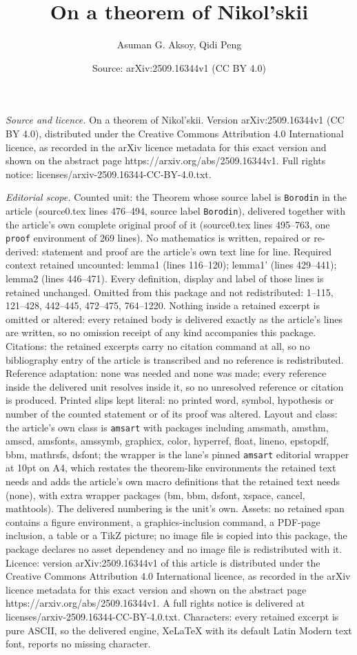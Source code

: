 \documentclass[10pt,a4paper]{amsart}
\title[On a theorem of Nikol'skii]{On a theorem of Nikol'skii}
\author{Asuman G. Aksoy, Qidi Peng}
\date{Source: arXiv:2509.16344v1 (CC BY 4.0)}
\begin{document}
\maketitle

\noindent\emph{Source and licence.} On a theorem of Nikol'skii. Version arXiv:2509.16344v1 (CC BY 4.0), distributed under the Creative Commons Attribution 4.0 International licence, as recorded in the arXiv licence metadata for this exact version and shown on the abstract page https://arxiv.org/abs/2509.16344v1. Full rights notice: licenses/arxiv-2509.16344-CC-BY-4.0.txt.\par\smallskip

\noindent\textit{Editorial scope.} Counted unit: the Theorem whose source label is \texttt{Borodin} in the article (source0.tex lines 476--494, source label \texttt{Borodin}), delivered together with the article's own complete original proof of it (source0.tex lines 495--763, one \texttt{proof} environment of 269 lines). No mathematics is written, repaired or re-derived: statement and proof are the article's own text line for line. Required context retained uncounted: lemma1 (lines 116--120); lemma1' (lines 429--441); lemma2 (lines 446--471). Every definition, display and label of those lines is retained unchanged. Omitted from this package and not redistributed: 1--115, 121--428, 442--445, 472--475, 764--1220. Nothing inside a retained excerpt is omitted or altered: every retained body is delivered exactly as the article's lines are written, so no omission receipt of any kind accompanies this package. Citations: the retained excerpts carry no citation command at all, so no bibliography entry of the article is transcribed and no reference is redistributed. Reference adaptation: none was needed and none was made; every reference inside the delivered unit resolves inside it, so no unresolved reference or citation is produced. Printed slips kept literal: no printed word, symbol, hypothesis or number of the counted statement or of its proof was altered. Layout and class: the article's own class is \texttt{amsart} with packages including amsmath, amsthm, amscd, amsfonts, amssymb, graphicx, color, hyperref, float, lineno, epstopdf, bbm, mathrsfs, dsfont; the wrapper is the lane's pinned \texttt{amsart} editorial wrapper at 10pt on A4, which restates the theorem-like environments the retained text needs and adds the article's own macro definitions that the retained text needs (none), with extra wrapper packages (bm, bbm, dsfont, xspace, cancel, mathtools). The delivered numbering is the unit's own. Assets: no retained span contains a figure environment, a graphics-inclusion command, a PDF-page inclusion, a table or a TikZ picture; no image file is copied into this package, the package declares no asset dependency and no image file is redistributed with it. Licence: version arXiv:2509.16344v1 of this article is distributed under the Creative Commons Attribution 4.0 International licence, as recorded in the arXiv licence metadata for this exact version and shown on the abstract page https://arxiv.org/abs/2509.16344v1. A full rights notice is delivered at licenses/arxiv-2509.16344-CC-BY-4.0.txt. Characters: every retained excerpt is pure ASCII, so the delivered engine, XeLaTeX with its default Latin Modern text font, reports no missing character.
\end{document}
